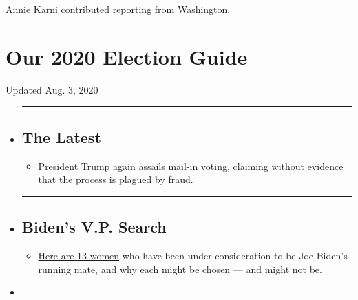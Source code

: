 Annie Karni contributed reporting from Washington.

\hypertarget{our-2020-election-guide}{%
\section{Our 2020 Election Guide}\label{our-2020-election-guide}}

Updated Aug. 3, 2020

\begin{itemize}
\item
  \begin{center}\rule{0.5\linewidth}{\linethickness}\end{center}

  \hypertarget{the-latest}{%
  \subsection{The Latest}\label{the-latest}}

  \begin{itemize}
  \tightlist
  \item
    President Trump again assails mail-in voting,
    \href{https://www.nytimes.com/2020/08/03/us/politics/trump-mail-in-voting.html?action=click\&pgtype=Article\&state=default\&region=BELOW_MAIN_CONTENT\&context=storylines_guide}{claiming
    without evidence that the process is plagued by fraud}.
  \end{itemize}
\item
  \begin{center}\rule{0.5\linewidth}{\linethickness}\end{center}

  \hypertarget{bidens-vp-search}{%
  \subsection{Biden's V.P. Search}\label{bidens-vp-search}}

  \begin{itemize}
  \tightlist
  \item
    \href{https://www.nytimes.com/article/biden-vice-president-2020.html?action=click\&pgtype=Article\&state=default\&region=BELOW_MAIN_CONTENT\&context=storylines_guide}{Here
    are 13 women} who have been under consideration to be Joe Biden's
    running mate, and why each might be chosen --- and might not be.
  \end{itemize}
\item
  \begin{center}\rule{0.5\linewidth}{\linethickness}\end{center}


\end{itemize}
